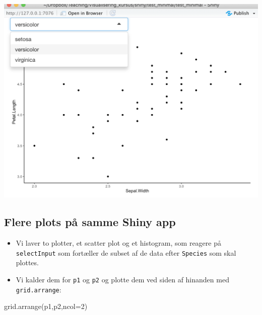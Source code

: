 \documentclass[
]{book}
\newenvironment{Shaded}{\begin{snugshade}}{\end{snugshade}}
\newcommand{\AttributeTok}[1]{\textcolor[rgb]{0.77,0.63,0.00}{#1}}
\newcommand{\DecValTok}[1]{\textcolor[rgb]{0.00,0.00,0.81}{#1}}
\newcommand{\FunctionTok}[1]{\textcolor[rgb]{0.00,0.00,0.00}{#1}}
\newcommand{\NormalTok}[1]{#1}
\providecommand{\tightlist}{%
  \setlength{\itemsep}{0pt}\setlength{\parskip}{0pt}}
\begin{document}
\includegraphics[width=0.75\linewidth]{plots/shiny_02}

\hypertarget{flere-plots-puxe5-samme-shiny-app}{%
\subsection{Flere plots på samme Shiny app}\label{flere-plots-puxe5-samme-shiny-app}}

\begin{itemize}
\tightlist
\item
  Vi laver to plotter, et scatter plot og et histogram, som reagere på \texttt{selectInput} som fortæller de subset af de data efter \texttt{Species} som skal plottes.
\item
  Vi kalder dem for \texttt{p1} og \texttt{p2} og plotte dem ved siden af hinanden med \texttt{grid.arrange}:
\end{itemize}

\begin{Shaded}
\begin{Highlighting}[]
\FunctionTok{grid.arrange}\NormalTok{(p1,p2,}\AttributeTok{ncol=}\DecValTok{2}\NormalTok{)}
\end{Highlighting}
\end{Shaded}
\end{document}
